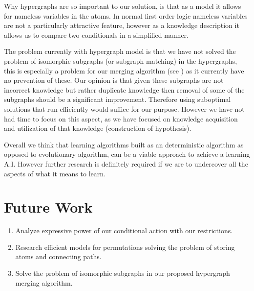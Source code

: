 \documentclass[Master.tex]{subfiles}
\begin{document}
	Why hypergraphs are so important to our solution, is that as a model it allows for nameless variables in the atoms. 
	In normal first order logic nameless variables are not a particularly attractive feature, 
	however as a knowledge description it allows us to compare two conditionals in a simplified manner.
	
	The problem currently with hypergraph model is that we have not solved the problem of isomorphic subgraphs (or subgraph matching) in the hypergraphs, 
	this is especially a problem for our merging algorithm (see ) as it currently have no prevention of these.
	Our opinion is that given these subgraphs are not incorrect knowledge but rather duplicate knowledge then removal of some of the subgraphs should be a significant improvement.
	Therefore using suboptimal solutions that run efficiently would suffice for our purpose. 
	However we have not had time to focus on this aspect, as we have focused on knowledge acquisition and utilization of that knowledge (construction of hypothesis).
	
	
	Overall we think that learning algorithms built as an deterministic algorithm as opposed to evolutionary algorithm, can be a viable approach to achieve a learning A.I. However further research is definitely required if we are to undercover all the aspects of what it means to learn.
	
	
	
	
	
	

	\section{Future Work}
	
	\begin{enumerate}
		\item Analyze expressive power of our conditional action with our restrictions.
		\item Research efficient models for permutations solving the problem of storing atoms and connecting paths.
		\item Solve the problem of isomorphic subgraphs in our proposed hypergraph merging algorithm.
	\end{enumerate}
	
\end{document}
